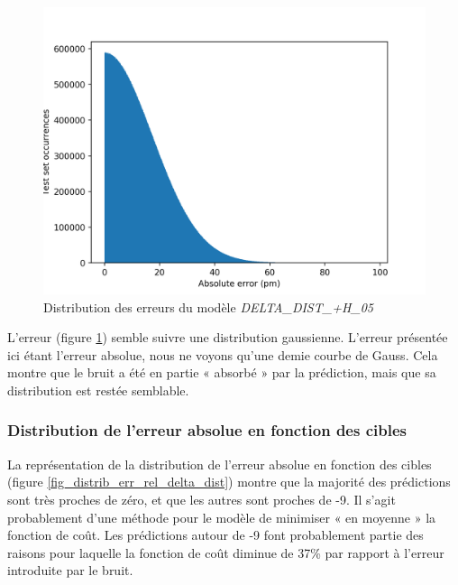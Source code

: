 \begin{figure}
	\centering
	
	\includegraphics[scale=0.7]{../figures/DELTA_DIST_+H_05/DELTA_DIST+H_05_distrib_rmse_val.png}	
	
	\caption{Distribution des erreurs du modèle \emph{DELTA\_DIST\_+H\_05}}
	\label{fig_distrib_err_delta_dist}
\end{figure}

L'erreur (figure \ref{fig_distrib_err_delta_dist}) semble suivre une distribution gaussienne. L'erreur présentée ici étant l'erreur absolue, nous ne voyons qu'une demie courbe de Gauss. Cela montre que le bruit a été en partie « absorbé » par la prédiction, mais que sa distribution est restée semblable.

\subsubsection{Distribution de l'erreur absolue en fonction des cibles}

La représentation de la distribution de l'erreur absolue en fonction des cibles (figure \ref{fig_distrib_err_rel_delta_dist}) montre que la majorité des prédictions sont très proches de zéro, et que les autres sont proches de -9. Il s'agit probablement d'une méthode pour le modèle de minimiser « en moyenne » la fonction de coût. Les prédictions autour de -9 font probablement partie des raisons pour laquelle la fonction de coût diminue de 37\% par rapport à l'erreur introduite par le bruit.


